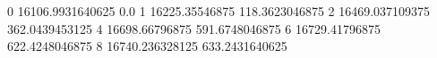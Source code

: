 0 16106.9931640625 0.0
1 16225.35546875 118.3623046875
2 16469.037109375 362.0439453125
4 16698.66796875 591.6748046875
6 16729.41796875 622.4248046875
8 16740.236328125 633.2431640625
